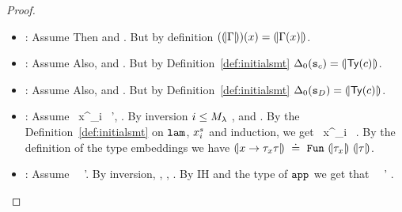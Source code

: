 \begin{proof}
\begin{itemize}
\item \lgvar : 
Assume 
Then 
    and 
   .
But by definition 
  $((\!|\Gamma|\!)) (x) = (\!|\Gamma(x)|\!)$. 

\item \lgpop : 
Assume 
Also, 
    and 
   .
But by Definition~\ref{def:initialsmt}
  $\Delta_0 (\texttt{s}_{c}) = (\!|\mathsf{Ty}({c})|\!)$. 

\item \lgdc : 
Assume 
	\tologicshort{\env}{\dc}{\constty{\dc}}{\smtvar{\dc}}{\embed{\constty{\dc}}}{\emptyset}{\emptyaxioms}
Also, 
   \hastype{\env}{\dc}{\constty{\dc}} and 
   \smthastype{\smtenvinit, \embed{\env}}{\smtvar{\dc}}{\smtenvinit (\smtvar{\dc})}.
But by Definition~\ref{def:initialsmt}
  $\Delta_0(\texttt{s}_{D}) = (\!|\mathsf{Ty}({c})|\!)$. 

\item \lgfun : 
Assume 
	        {\ {x^{}_{i}}\ {\pred}}
	        {\sort'}{\smtenv, }{}. 
By inversion 
    $i \leq  {M_\lambda} $
	, and
  	.
By the Definition~\ref{def:initialsmt} on $\texttt{lam}^{}_{}$, $x^{s}_i$ and induction, we get
   \smthastype{\smtenvinit, \embed{\env}}
     {\ {x^{}_{i}}\ {\pred}}
     {}.
By the definition of the type embeddings we have
$\embed{\tfunbasic{x}{\typ_x}{\typ}} \defeq \tsmtfun{\embed{\typ_x}}{\embed{\typ}}$.


\item \lgapp : 
Assume 
  {\ {\pred}\ {\pred'}}{\embed{\typ}}{\smtenv}{}. 
By inversion, 
	, 
	,
	. 
By IH and the type of $\texttt{app}^{}_{}$ we get that 
   \smthastype{\smtenvinit, \embed{\env}}
     {\ {\pred}\ {\pred'}}
     {\embed{\typ}}.


\end{itemize}
\end{proof}
